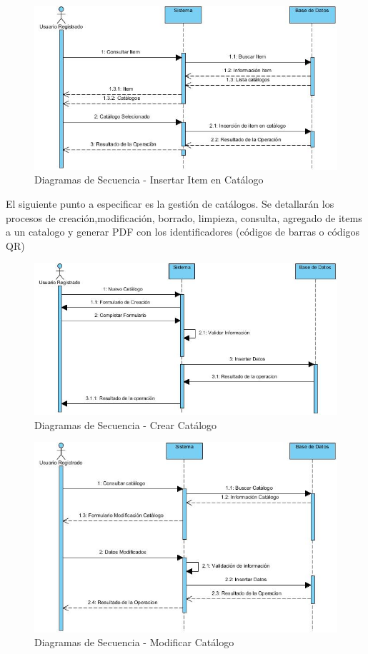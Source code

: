 \documentclass[a4paper,11pt]{book}
\begin{document}
\begin{figure}[H] 
\centering 
\includegraphics[scale=0.50]{imagenes/secuencia/Insertar_Item_Catalogo.jpg}
\caption{ Diagramas de Secuencia - Insertar Item en Catálogo\cite{diagrama}  }  
\end{figure}

El siguiente punto a especificar es la gestión de catálogos. Se detallarán los procesos de creación,modificación, borrado, limpieza, consulta, agregado de items a un catalogo y generar PDF con los identificadores (códigos de barras o códigos QR)  

\begin{figure}[H] 
\centering 
\includegraphics[scale=0.50]{imagenes/secuencia/Crear_Catalogo.jpg}
\caption{ Diagramas de Secuencia - Crear Catálogo\cite{diagrama}  }  
\end{figure}

\begin{figure}[H] 
\centering 
\includegraphics[scale=0.50]{imagenes/secuencia/Modificar_Catalogo.jpg}
\caption{ Diagramas de Secuencia - Modificar Catálogo\cite{diagrama}  }  
\end{figure}
\end{document}
